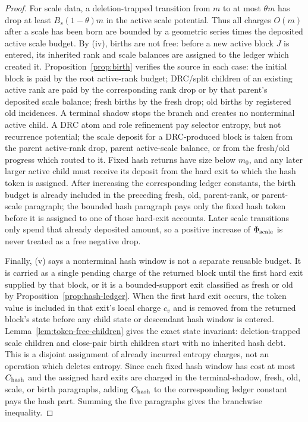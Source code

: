\documentclass[11pt]{article}
\begin{document}
\begin{proof}
For scale data, a deletion-trapped transition from $m$ to at most
$\theta m$ has drop at least $B_s(1-\theta)m$ in the active scale potential.
Thus all charges $O(m)$ after a scale has been born are bounded by a geometric
series times the deposited active scale budget.  By (iv), births are not free:
before a new active block $J$ is entered, its inherited rank and scale balances
are assigned to the ledger which created it.  Proposition~\ref{prop:birth}
verifies the source in each case: the initial block is paid by the root
active-rank budget; DRC/split children of an existing active rank are paid by
the corresponding rank drop or by that parent's deposited scale balance; fresh
births by the fresh drop; old births by registered old incidences.  A terminal
shadow stops the branch and creates no nonterminal active child.  A DRC atom
and role refinement pay selector entropy, but not recurrence potential; the
scale deposit for a DRC-produced block is taken from the parent active-rank
drop, parent active-scale balance, or from the fresh/old progress which routed
to it.  Fixed hash returns
have size below $m_0$, and any later larger active child must receive its
deposit from the hard exit to which the hash token is assigned.  After
increasing the corresponding ledger constants, the birth budget is already
included in the preceding fresh, old, parent-rank, or parent-scale paragraph;
the bounded hash paragraph pays only the fixed hash token before it is assigned
to one of those hard-exit accounts.
Later scale transitions only spend that already deposited amount, so a positive
increase of $\Phi_{\rm scale}$ is never treated as a free negative drop.

Finally, (v) says a nonterminal hash window is not a separate reusable budget.
It is carried as a single pending charge of the returned block until the first
hard exit supplied by that block, or it is a bounded-support exit classified
as fresh or old by Proposition~\ref{prop:hash-ledger}.  When the first hard
exit occurs, the token value is included in that exit's local charge $c_v$ and
is removed from the returned block's state before any child state or descendant
hash window is entered.  Lemma~\ref{lem:token-free-children} gives the exact
state invariant: deletion-trapped scale children and close-pair birth children
start with no inherited hash debt.  This is a disjoint assignment of already
incurred entropy charges, not an operation which deletes entropy.  Since each
fixed hash window has cost at most $C_{\rm hash}$ and the assigned hard exits
are charged in the terminal-shadow, fresh, old, scale, or birth paragraphs,
adding $C_{\rm hash}$ to the corresponding ledger constant pays the hash part.
Summing the five paragraphs gives the branchwise inequality.
\end{proof}
\end{document}
